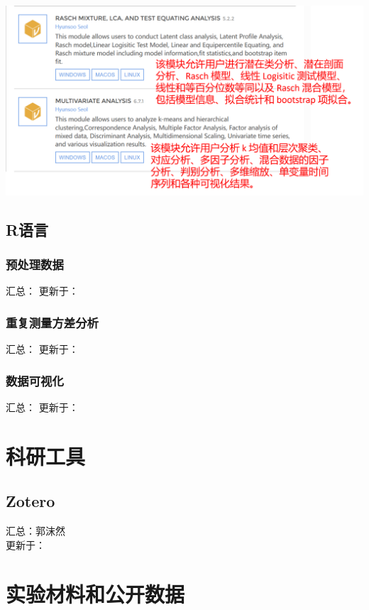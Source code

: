 \documentclass[]{ctexbook}
\theoremstyle{definition}
\theoremstyle{definition}
\theoremstyle{definition}
\theoremstyle{definition}
\theoremstyle{remark}
\begin{document}
\includegraphics{img/jamovi/modules4.png}

\chapter{R语言}\label{r}

\section{预处理数据}\label{r-prepro}

汇总：
更新于：

\section{重复测量方差分析}\label{r-rm-anova}

汇总：
更新于：

\section{数据可视化}\label{r-plot}

汇总：
更新于：

\part{科研工具}\label{part-ux79d1ux7814ux5de5ux5177}

\chapter{Zotero}\label{zotero}

汇总：郭沫然\\
更新于：

\part{实验材料和公开数据}\label{part-ux5b9eux9a8cux6750ux6599ux548cux516cux5f00ux6570ux636e}
\end{document}
